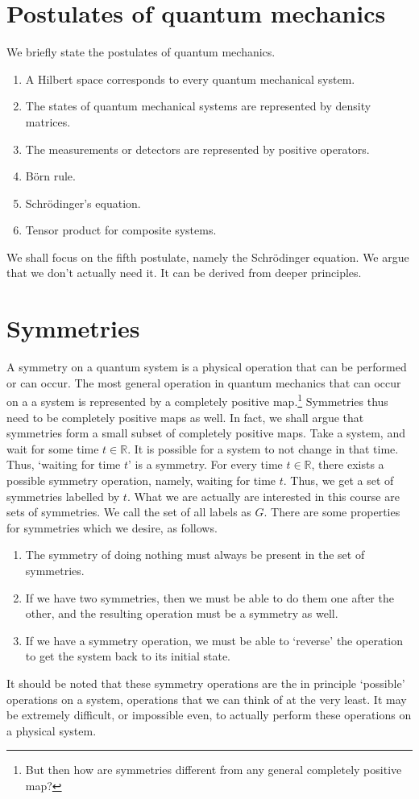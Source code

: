 \documentclass[a4 paper, 12pt]{book}
\theoremstyle{definition}
\newcommand{\rr}{\mathbb{R}}
\begin{document}
	\section{Postulates of quantum mechanics}

	We briefly state the postulates of quantum mechanics.
	\begin{enumerate}
	    \item A Hilbert space corresponds to every quantum mechanical system.
		\item The states of quantum mechanical systems are represented by density matrices.
		\item The measurements or detectors are represented by positive operators.
		\item B\"orn rule.
		\item Schr\"odinger's equation.
		\item Tensor product for composite systems.
	\end{enumerate}
	We shall focus on the fifth postulate, namely the Schr\"odinger equation. We argue that we don't actually need it. It can be derived from deeper principles.

	\section{Symmetries}

	A symmetry on a quantum system is a physical operation that can be performed or can occur. The most general operation in quantum mechanics that can occur on a a system is represented by a completely positive map.\footnote{But then how are symmetries different from any general completely positive map?} Symmetries thus need to be completely positive maps as well. In fact, we shall argue that symmetries form a small subset of completely positive maps.
	Take a system, and wait for some time \(t \in \rr\). It is possible for a system to not change in that time. Thus, `waiting for time \(t\)' is a symmetry. For every time \(t \in \rr\), there exists a possible symmetry operation, namely, waiting for time \(t\). Thus, we get a set of symmetries labelled by \(t\). What we are actually are interested in this course are sets of symmetries. We call the set of all labels as \(G\). There are some properties for symmetries which we desire, as follows.
	\begin{enumerate}
	    \item The symmetry of doing nothing must always be present in the set of symmetries.
		\item If we have two symmetries, then we must be able to do them one after the other, and the resulting operation must be a symmetry as well.
		\item If we have a symmetry operation, we must be able to `reverse' the operation to get the system back to its initial state.
	\end{enumerate}
	It should be noted that these symmetry operations are the in principle `possible' operations on a system, operations that we can think of at the very least. It may be extremely difficult, or impossible even, to actually perform these operations on a physical system.
\end{document}
